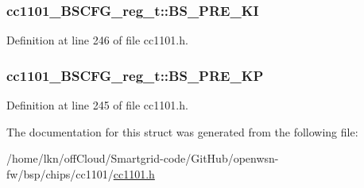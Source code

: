 \subsubsection[{\texorpdfstring{B\+S\+\_\+\+P\+R\+E\+\_\+\+KI}{BS_PRE_KI}}]{ cc1101\+\_\+\+B\+S\+C\+F\+G\+\_\+reg\+\_\+t\+::\+B\+S\+\_\+\+P\+R\+E\+\_\+\+KI}\hypertarget{structcc1101___b_s_c_f_g__reg__t_ad14f3cb2da3ce9e319f681d5059e8b76}{}\label{structcc1101___b_s_c_f_g__reg__t_ad14f3cb2da3ce9e319f681d5059e8b76}


Definition at line 246 of file cc1101.\+h.

\subsubsection[{\texorpdfstring{B\+S\+\_\+\+P\+R\+E\+\_\+\+KP}{BS_PRE_KP}}]{ cc1101\+\_\+\+B\+S\+C\+F\+G\+\_\+reg\+\_\+t\+::\+B\+S\+\_\+\+P\+R\+E\+\_\+\+KP}\hypertarget{structcc1101___b_s_c_f_g__reg__t_af6b1ff27b8200c3c154cd5c5792e79f7}{}\label{structcc1101___b_s_c_f_g__reg__t_af6b1ff27b8200c3c154cd5c5792e79f7}


Definition at line 245 of file cc1101.\+h.



The documentation for this struct was generated from the following file\+:\begin{DoxyCompactItemize}
\item 
/home/lkn/off\+Cloud/\+Smartgrid-\/code/\+Git\+Hub/openwsn-\/fw/bsp/chips/cc1101/\hyperlink{cc1101_8h}{cc1101.\+h}\end{DoxyCompactItemize}
